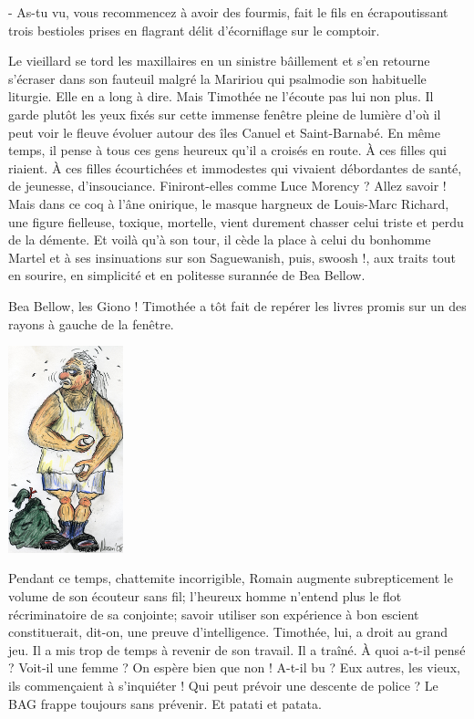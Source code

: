 - As-tu vu, vous recommencez à avoir des fourmis, fait le fils en écrapoutissant trois bestioles prises en flagrant délit d’écorniflage sur le comptoir.

Le vieillard se tord les maxillaires en un sinistre bâillement et s’en retourne s’écraser dans son fauteuil malgré la Maririou qui psalmodie son habituelle liturgie. Elle en a long à dire. Mais Timothée ne l’écoute pas lui non plus. Il garde plutôt les yeux fixés sur cette immense fenêtre pleine de lumière d’où il peut voir le fleuve évoluer autour des îles Canuel et Saint-Barnabé. En même temps, il pense à tous ces gens heureux qu’il a croisés en route. À ces filles qui riaient. À ces filles écourtichées et immodestes qui vivaient débordantes de santé, de jeunesse, d’insouciance. Finiront-elles comme Luce Morency ? Allez savoir ! Mais dans ce coq à l’âne onirique, le masque hargneux de Louis-Marc Richard, une figure fielleuse, toxique, mortelle, vient durement chasser celui triste et perdu de la démente. Et voilà qu’à son tour, il cède la place à celui du bonhomme Martel et à ses insinuations sur son Saguewanish, puis, swoosh !, aux traits tout en sourire, en simplicité et en politesse surannée de Bea Bellow.

Bea Bellow, les Giono ! Timothée a tôt fait de repérer les livres promis sur un des rayons à gauche de la fenêtre.

\begin{floatingfigure}[l]{40mm}
\includegraphics[height=60mm]{corps/chapitre4/img/romain1.jpg}
\end{floatingfigure}

Pendant ce temps, chattemite incorrigible, Romain augmente subrepticement le volume de son écouteur sans fil; l’heureux homme n’entend plus le flot récriminatoire de sa conjointe; savoir utiliser son expérience à bon escient constituerait, dit-on, une preuve d’intelligence. Timothée, lui, a droit au grand jeu. Il a mis trop de temps à revenir de son travail. Il a traîné. À quoi a-t-il pensé ? Voit-il une femme ? On espère bien que non ! A-t-il bu ? Eux autres, les vieux, ils commençaient à s’inquiéter ! Qui peut prévoir une descente de police ? Le BAG frappe toujours sans prévenir. Et patati et patata.

